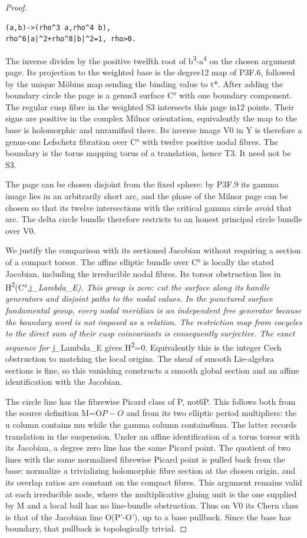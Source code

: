 \begin{proof}
\begin{lstlisting}
(a,b)->(rho^3 a,rho^4 b),
rho^6|a|^2+rho^8|b|^2=1, rho>0.
\end{lstlisting}

The inverse divides by the positive twelfth root of b\textsuperscript{3}-a\textsuperscript{4} on the chosen argument page. Its projection to the weighted base is the degree12 map of P3F.6, followed by the unique Möbius map sending the binding value to t*. After adding the boundary circle the page is a genus3 surface C° with one boundary component. The regular cusp fibre in the weighted S3 intersects this page in12 points. Their signs are positive in the complex Milnor orientation, equivalently the map to the base is holomorphic and unramified there. Its inverse image V0 in Y is therefore a genus-one Lefschetz fibration over C° with twelve positive nodal fibres. The boundary is the torus mapping torus of a translation, hence T3. It need not be S3.

The page can be chosen disjoint from the fixed sphere: by P3F.9 its gamma image lies in an arbitrarily short arc, and the phase of the Milnor page can be chosen so that its twelve intersections with the critical gamma circle avoid that arc. The delta circle bundle therefore restricts to an honest principal circle bundle over V0.

We justify the comparison with its sectioned Jacobian without requiring a section of a compact torsor. The affine elliptic bundle over C° is locally the stated Jacobian, including the irreducible nodal fibres. Its torsor obstruction lies in H\textsuperscript{2}(C°,j\_\emph{Lambda\_E). This group is zero: cut the surface along its handle generators and disjoint paths to the nodal values. In the punctured surface fundamental group, every nodal meridian is an independent free generator because the boundary word is not imposed as a relation. The restriction map from cocycles to the direct sum of their cusp coinvariants is consequently surjective. The exact sequence for j\_}Lambda\_E gives H\textsuperscript{2}=0. Equivalently this is the integer Cech obstruction to matching the local origins. The sheaf of smooth Lie-algebra sections is fine, so this vanishing constructs a smooth global section and an affine identification with the Jacobian.

The circle line has the fibrewise Picard class of P, not6P. This follows both from the source definition M=O\(P-O\) and from its two elliptic period multipliers: the u column contains mu while the gamma column contains6mu. The latter records translation in the suspension. Under an affine identification of a torus torsor with its Jacobian, a degree zero line has the same Picard point. The quotient of two lines with the same normalized fibrewise Picard point is pulled back from the base: normalize a trivializing holomorphic fibre section at the chosen origin, and its overlap ratios are constant on the compact fibres. This argument remains valid at each irreducible node, where the multiplicative gluing unit is the one supplied by M and a local ball has no line-bundle obstruction. Thus on V0 its Chern class is that of the Jacobian line O(P'-O'), up to a base pullback. Since the base has boundary, that pullback is topologically trivial.


\end{proof}
